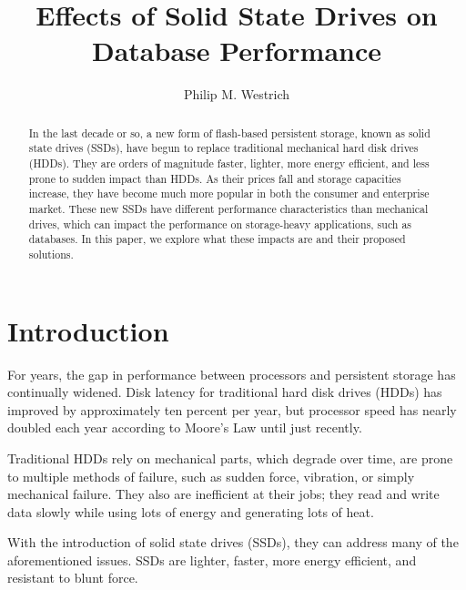 \documentclass[format=acmsmall, review=false, screen=true]{acmart}
\begin{document}
\title[Effects of SSDs on Databases]{Effects of Solid State Drives on Database Performance}  
\author{Philip M. Westrich}

\begin{abstract}

    In the last decade or so, a new form of flash-based persistent storage, known as solid state drives (SSDs), have begun 
    to replace traditional mechanical hard disk drives (HDDs). They are orders of magnitude faster, lighter, more energy 
    efficient, and less prone to sudden impact than HDDs. As their prices fall and storage capacities increase, they have 
    become much more popular in both the consumer and enterprise market. These new SSDs have different performance characteristics
    than mechanical drives, which can impact the performance on storage-heavy applications, such as databases. In this paper, 
    we explore what these impacts are and their proposed solutions.
 
\end{abstract}

\maketitle

\section{Introduction}

For years, the gap in performance between processors and persistent storage has continually widened. Disk latency for 
traditional hard disk drives (HDDs) has improved by approximately ten percent per year, but processor speed has nearly 
doubled each year according to Moore's Law until just recently. \cite{Xie2011}

Traditional HDDs rely on mechanical parts, which degrade over time, are prone to multiple methods of failure, such as 
sudden force, vibration, or simply mechanical failure. They also are inefficient at their jobs; they read and write data 
slowly while using lots of energy and generating lots of heat. \cite{Xie2011}

With the introduction of solid state drives (SSDs), they can address many of the aforementioned issues. SSDs are lighter, 
faster, more energy efficient, and resistant to blunt force. \cite{Xie2011} 
\end{document}

